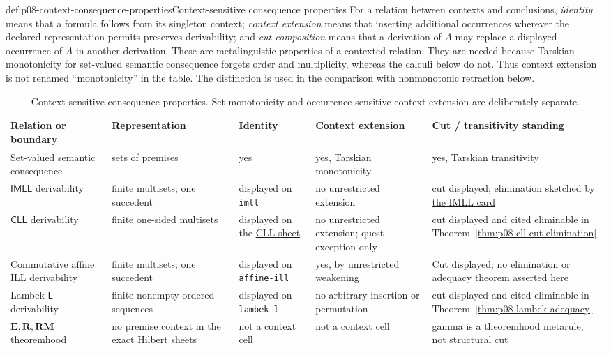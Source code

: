\begin{hbdefinition}{def:p08-context-consequence-properties}{Context-sensitive consequence properties}
For a relation between contexts and conclusions, \emph{identity} means that a
formula follows from its singleton context; \emph{context extension} means
that inserting additional occurrences wherever the declared representation
permits preserves derivability; and \emph{cut composition} means that a
derivation of \(A\) may replace a displayed occurrence of \(A\) in another
derivation.  These are metalinguistic properties of a contexted relation.  They
are needed because Tarskian monotonicity for set-valued semantic consequence
forgets order and multiplicity, whereas the calculi below do not.  Thus context
extension is not renamed ``monotonicity'' in the table.  The distinction is
used in the comparison with nonmonotonic retraction below.
\end{hbdefinition}

\begin{table}[!htbp]
\centering
\begingroup\scriptsize
\setlength{\tabcolsep}{3pt}
\begin{tabular}{@{}p{}p{}p{}
  p{}p{}@{}}
\toprule
Relation or boundary & Representation & Identity & Context extension & Cut /
transitivity standing \\
\midrule
Set-valued semantic consequence & sets of premises & yes & yes, Tarskian
monotonicity & yes, Tarskian transitivity \\
\(\mathsf{IMLL}\) derivability & finite multisets; one succedent & displayed
on \texttt{imll} & no unrestricted extension & cut displayed; elimination
sketched by \hyperref[entry:p08-imll]{the IMLL card} \\
\(\mathsf{CLL}\) derivability & finite one-sided multisets & displayed on the
\hyperref[sheet:cll-one-sided]{CLL sheet} & no unrestricted extension; quest
exception only &
cut displayed and cited eliminable in
Theorem~\ref{thm:p08-cll-cut-elimination} \\
Commutative affine ILL derivability & finite multisets; one succedent &
displayed on \hyperref[sheet:affine-ill]{\texttt{affine-ill}} &
yes, by unrestricted weakening & Cut displayed; no elimination or adequacy
theorem asserted here \\
Lambek \(\mathsf L\) derivability & finite nonempty ordered sequences &
displayed on \texttt{lambek-l} & no arbitrary insertion or permutation & cut
displayed and cited eliminable in Theorem~\ref{thm:p08-lambek-adequacy} \\
\(\mathbf E,\mathbf R,\mathbf{RM}\) theoremhood & no premise context in the
exact Hilbert sheets & not a context cell & not a context cell & gamma is a
theoremhood metarule, not structural cut \\
\bottomrule
\end{tabular}
\endgroup
\caption{Context-sensitive consequence properties.  Set monotonicity and
occurrence-sensitive context extension are deliberately separate.}
\label{tab:p08-consequence-properties}
\end{table}

